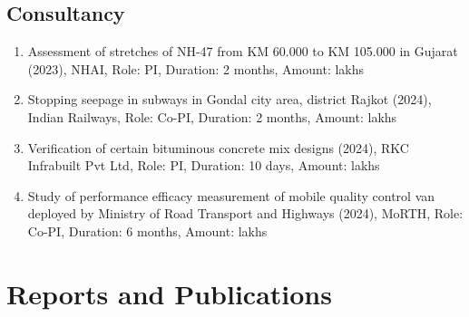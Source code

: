 \documentclass[12pt]{article}
\begin{document}
\hfill
\subsection*{Consultancy}
\begin{enumerate}
	\item Assessment of stretches of NH-47 from KM 60.000 to KM 105.000 in Gujarat (2023), NHAI, Role: PI, Duration: 2 months, Amount:  lakhs
	\item Stopping seepage in subways in Gondal city area, district Rajkot (2024), Indian Railways, Role: Co-PI, Duration: 2 months, Amount:  lakhs
	\item Verification of certain bituminous concrete mix designs (2024), RKC Infrabuilt Pvt Ltd, Role: PI, Duration: 10 days, Amount:  lakhs
	\item Study of performance efficacy measurement of mobile quality control van deployed by Ministry of Road Transport and Highways (2024), MoRTH, Role: Co-PI, Duration: 6 months, Amount:  lakhs
\end{enumerate}


\bigskip
\section*{Reports and Publications}
\hfill
\end{document}
